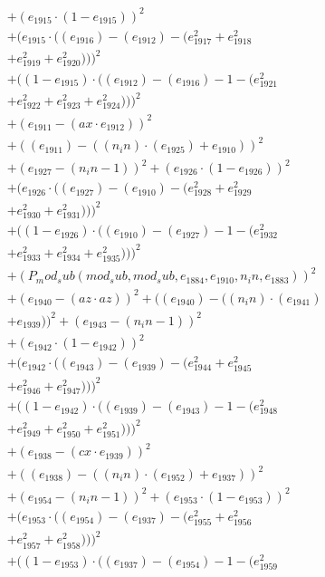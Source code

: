 \documentclass[10pt, a4paper]{article}
\begin{document}
\begin{align*}
& + (e_{1915}  \cdot  (1 - e_{1915}))^{2} \\
& + (e_{1915}  \cdot  ((e_{1916}) - (e_{1912}) - (e_{1917}^{2} + e_{1918}^{2} \\
& + e_{1919}^{2} + e_{1920}^{2})))^{2} \\
& + ((1 - e_{1915})  \cdot  ((e_{1912}) - (e_{1916}) - 1 - (e_{1921}^{2} \\
& + e_{1922}^{2} + e_{1923}^{2} + e_{1924}^{2})))^{2} \\
& + (e_{1911} - (ax  \cdot  e_{1912}))^{2} \\
& + ((e_{1911}) - ((n_in)  \cdot  (e_{1925}) + e_{1910}))^{2} \\
& + (e_{1927} - (n_in - 1))^{2} + (e_{1926}  \cdot  (1 - e_{1926}))^{2} \\
& + (e_{1926}  \cdot  ((e_{1927}) - (e_{1910}) - (e_{1928}^{2} + e_{1929}^{2} \\
& + e_{1930}^{2} + e_{1931}^{2})))^{2} \\
& + ((1 - e_{1926})  \cdot  ((e_{1910}) - (e_{1927}) - 1 - (e_{1932}^{2} \\
& + e_{1933}^{2} + e_{1934}^{2} + e_{1935}^{2})))^{2} \\
& + (P_mod_sub(mod_sub, mod_sub, e_{1884}, e_{1910}, n_in, e_{1883}))^{2} \\
& + (e_{1940} - (az  \cdot  az))^{2} + ((e_{1940}) - ((n_in)  \cdot  (e_{1941}) \\
& + e_{1939}))^{2} + (e_{1943} - (n_in - 1))^{2} \\
& + (e_{1942}  \cdot  (1 - e_{1942}))^{2} \\
& + (e_{1942}  \cdot  ((e_{1943}) - (e_{1939}) - (e_{1944}^{2} + e_{1945}^{2} \\
& + e_{1946}^{2} + e_{1947}^{2})))^{2} \\
& + ((1 - e_{1942})  \cdot  ((e_{1939}) - (e_{1943}) - 1 - (e_{1948}^{2} \\
& + e_{1949}^{2} + e_{1950}^{2} + e_{1951}^{2})))^{2} \\
& + (e_{1938} - (cx  \cdot  e_{1939}))^{2} \\
& + ((e_{1938}) - ((n_in)  \cdot  (e_{1952}) + e_{1937}))^{2} \\
& + (e_{1954} - (n_in - 1))^{2} + (e_{1953}  \cdot  (1 - e_{1953}))^{2} \\
& + (e_{1953}  \cdot  ((e_{1954}) - (e_{1937}) - (e_{1955}^{2} + e_{1956}^{2} \\
& + e_{1957}^{2} + e_{1958}^{2})))^{2} \\
& + ((1 - e_{1953})  \cdot  ((e_{1937}) - (e_{1954}) - 1 - (e_{1959}^{2} \\

\end{align*}
\end{document}
